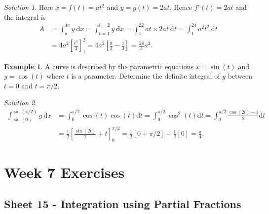 \documentclass[
  11pt,
  oneside]{book}
\newcommand{\slide}{}
\theoremstyle{definition}
\theoremstyle{definition}
\newtheorem{example}{Example}[chapter]
\theoremstyle{definition}
\theoremstyle{definition}
\theoremstyle{remark}
\newtheorem*{solution}{Solution}
\begin{document}
\begin{solution}
Here \(x=f(t)=at^2\) and \(y=g(t)=2at\). Hence \(f'(t) = 2at\) and the integral is
\begin{align*}
A &= \int_a^{4a} y\ \mathrm{d}x = \int_{t=1}^{t=2}y\ \mathrm{d}x = \int_1^22at\times 2at\ \mathrm{d}t = \int_1^24a^2t^2\ \mathrm{d}t\\
&= 4a^2\left[\frac{t^3}3\right]_1^2 = 4a^2\left[\frac 83-\frac13\right]=\frac{28}3a^2.
\end{align*}
\end{solution}

\slide

\begin{example}
A curve is described by the parametric equations \(x = \sin(t)\) and \(y = \cos(t)\) where \(t\) is a parameter. Determine the definite integral of \(y\) between \(t = 0\) and \(t = \pi/2\).
\end{example}

\begin{solution}
\begin{align*}
\int_{\sin(0)}^{\sin(\pi/2)}y\ \mathrm{d}x& = \int_0^{\pi/2}\cos(t)\cos(t)\mathrm{d}t = \int_0^{\pi/2}\cos^2(t)\mathrm{d}t = \int_0^{\pi/2}\frac{\cos(2t)+1}{2}\mathrm{d}t\\
& = \frac12\left[\frac{\sin(2t)}2+t\right]_0^{\pi/2} = \frac12\left[0+\pi/2\right]-\frac12\left[0\right]=\frac{\pi}4.
\end{align*}
\end{solution}

\chapter*{Week 7 Exercises}\label{week-7-exercises}

\section{Sheet 15 - Integration using Partial Fractions}\label{sheet-15---integration-using-partial-fractions}
\end{document}
